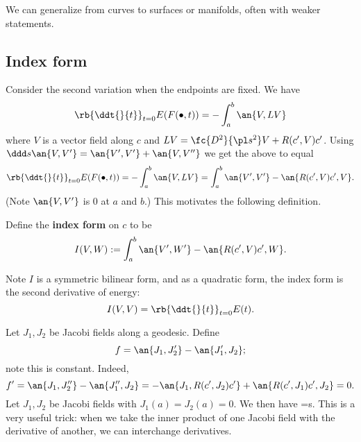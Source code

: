 
We can generalize from curves to surfaces or manifolds, often with weaker statements.
\subsection{Index form}
Consider the second variation when the endpoints are fixed. We have
\[
\rb{\ddt{}{t}}_{t=0} E(F(\bullet,t))=-\int_a^b \an{V,LV}
\]
where $V$ is a vector field along $c$ and $LV=\fc{D^2}{\pl s^2} V+R(c',V)c'$. Using $\ddd s\an{V,V'}=\an{V',V'}+\an{V,V''}$ we get the above to equal
\[
\rb{\ddt{}{t}}_{t=0} E(F(\bullet,t))=-\int_a^b \an{V,LV}=\int_a^b \an{V',V'}-\an{R(c',V)c',V}.
\]
(Note $\an{V,V'}$ is 0 at $a$ and $b$.) 
This motivates the following definition.
\begin{df}
Define the \textbf{index form} on $c$ to be
\[
I(V,W):=\int_a^b \an{V',W'}-\an{R(c',V)c',W}.
\]
\end{df}

Note $I$ is a symmetric bilinear form, and as a quadratic form, the index form is the second derivative of energy:
\[I(V,V)=\rb{\ddt{}{t}}_{t=0}E(t).\]


Let $J_1,J_2$ be Jacobi fields along a geodesic. Define
\[
f=\an{J_1,J_2'}-\an{J_1',J_2};
\] 
note this is constant. Indeed, 
\[
f'=\an{J_1,J_2''}-\an{J_1'',J_2}= -\an{J_1,R(c',J_2)c'}+\an{R(c',J_1)c',J_2}=0.
\]
Let $J_1,J_2$ be Jacobi fields with $J_1(a)=J_2(a)=0$. We then have
=s.
\eeq
This is a very useful trick: when we take the inner product of one Jacobi field with the derivative of another, we can interchange derivatives.

